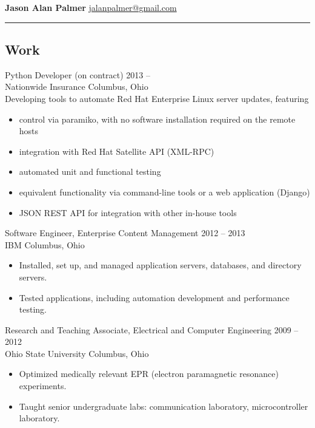 \documentclass[12pt]{report}
\begin{document}
\textbf{\large Jason Alan Palmer} \hfill \href{mailto:jalanpalmer@gmail.com}{jalanpalmer@gmail.com}

\rule{\textwidth}{1pt}

\subsection*{Work}

Python Developer (on contract) \hfill 2013 -- ~~~~~~ \\
Nationwide Insurance           \hfill Columbus, Ohio \\
Developing tools to automate Red Hat Enterprise Linux server updates, featuring
\begin{itemize}
\item control via paramiko, with no software installation required on the remote hosts
\item integration with Red Hat Satellite API (XML-RPC)
\item automated unit and functional testing
\item equivalent functionality via command-line tools or a web application (Django)
\item JSON REST API for integration with other in-house tools
\\
\end{itemize}

Software Engineer, Enterprise Content Management \hfill 2012 -- 2013 \\
IBM                                              \hfill Columbus, Ohio
\begin{itemize}
\item Installed, set up, and managed application servers, databases, and directory servers.
\item Tested applications, including automation development and performance testing.
\\
\end{itemize}

Research and Teaching Associate, Electrical and Computer Engineering \hfill 2009 -- 2012 \\
Ohio State University                                                \hfill Columbus, Ohio
\begin{itemize}
\item Optimized medically relevant EPR (electron paramagnetic resonance) experiments.
\item Taught senior undergraduate labs: communication laboratory, microcontroller laboratory.
\\
\end{itemize}
\end{document}
